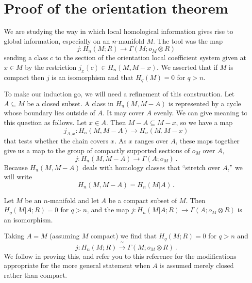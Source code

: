 \section{Proof of the orientation theorem}

We are studying the way in which local homological information gives rise
to global information, especially on an $n$-manifold $M$. The tool was the map
\[
j:H_n(M;R)\to\Gamma(M;o_M\otimes R)
\]
sending a class $c$ to the section of the orientation local coefficient
system given at $x\in M$ by the restriction $j_x(c)\in H_n(M,M-x)$. 
We asserted that if $M$ is compact then $j$ is an isomorphism and that
$H_q(M)=0$ for $q>n$. 

To make our induction go, we will need a refinement of this construction.
Let $A\subseteq M$ be a closed subset. A class in
$H_n(M,M-A)$ is represented by a cycle whose boundary lies outside of $A$. 
It may cover $A$ evenly. We can give meaning to this question as follows.
Let $x\in A$. Then $M-A\subseteq M-x$, so we have a map
\[
j_{A,x}:H_n(M,M-A)\to H_n(M,M-x)
\]
that tests whether the chain covers $x$. As $x$ ranges over $A$, 
these maps together give us a map to the group of compactly supported 
sections of $o_M$ over $A$,
\[
j:H_n(M,M-A)\to\Gamma(A;o_M)\,.
\]
Because $H_n(M,M-A)$ deals with homology classes that ``stretch over $A$,''
we will write
\[
H_n(M,M-A)=H_n(M|A)\,.
\]
\begin{theorem} Let $M$ be an $n$-manifold and let $A$ be a compact subset 
of $M$. Then $H_q(M|A;R)=0$ for $q>n$, and the map 
$j:H_n(M|A;R)\to\Gamma(A;o_M\otimes R)$ is an isomorphism.
\label{thm-fundamental-class}
\end{theorem}
Taking $A=M$ (assuming $M$ compact) we find that $H_q(M;R)=0$ for $q>n$ and 
\[
j:H_n(M;R)\xrightarrow{\cong}\Gamma(M;o_M\otimes R)\,.
\]
We follow \cite{bredon} in proving this, 
and refer you to this reference for the modifications appropriate for
the more general statement when $A$ is assumed merely closed rather than
compact.

